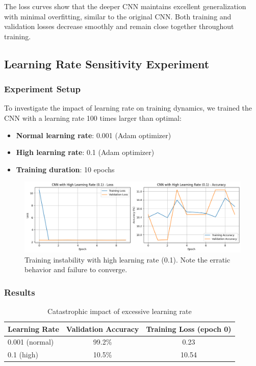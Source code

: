 The loss curves show that the deeper CNN maintains excellent generalization with minimal overfitting, similar to the original CNN. Both training and validation losses decrease smoothly and remain close together throughout training.

\subsection{Learning Rate Sensitivity Experiment}

\subsubsection{Experiment Setup}

To investigate the impact of learning rate on training dynamics, we trained the CNN with a learning rate 100 times larger than optimal:
\begin{itemize}
    \item \textbf{Normal learning rate}: 0.001 (Adam optimizer)
    \item \textbf{High learning rate}: 0.1 (Adam optimizer)
    \item \textbf{Training duration}: 10 epochs
\end{itemize}

\begin{figure}[h]
    \centering
    \includegraphics[width=0.8\linewidth]{section4/high_lr.png}
    \caption{Training instability with high learning rate (0.1). Note the erratic behavior and failure to converge.}
    \label{fig:high-lr}
\end{figure}

\subsubsection{Results}

\begin{table}[h]
\centering
\begin{tabular}{|l|c|c|}
\hline
\textbf{Learning Rate} & \textbf{Validation Accuracy} & \textbf{Training Loss (epoch 0)} \\ \hline
0.001 (normal)         & 99.2\%                       & 0.23                             \\ \hline
0.1 (high)             & 10.5\%                       & 10.54                            \\ \hline
\end{tabular}
\caption{Catastrophic impact of excessive learning rate}
\label{tab:learning-rate-comparison}
\end{table}

